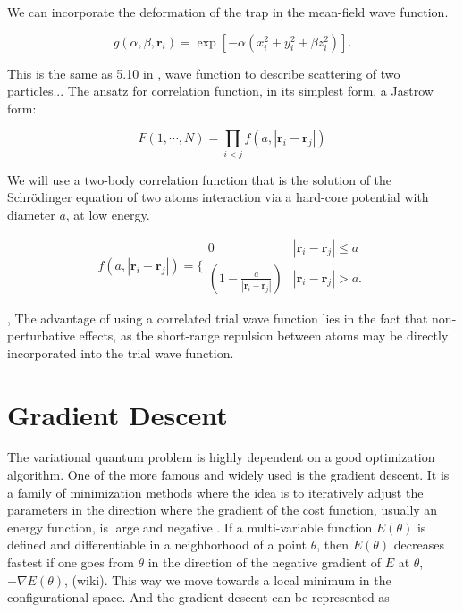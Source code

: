 We can incorporate the deformation of the trap in the mean-field wave function. 

\begin{equation} \label{eq:spf_g}
g(\alpha,\beta,\mathbf{r}_i)= \exp{[-\alpha(x_i^2+y_i^2+\beta z_i^2)]}.
\end{equation}

This is the same as 5.10 in \cite{BECCondInDilute}, wave function to describe scattering of two particles...
The ansatz for correlation function, in its simplest form, a Jastrow form:

\begin{equation}
F(1, \cdots, N) = \prod_{i < j}f(a,|\mathbf{r}_i-\mathbf{r}_j|)
\end{equation}

We will use a two-body correlation function that is the solution of the Schrödinger equation of two atoms interaction via a hard-core potential with diameter $a$, at low energy.

\begin{equation} \label{eq:jastrow_f}
    f(a,|\mathbf{r}_i-\mathbf{r}_j|)=\Bigg\{
 \begin{array}{ll}
	 0 & {|\mathbf{r}_i-\mathbf{r}_j|} \leq {a}\\
	 (1-\frac{a}{|\mathbf{r}_i-\mathbf{r}_j|}) & {|\mathbf{r}_i-\mathbf{r}_j|} > {a}.
 \end{array}
\end{equation}

\cite{nilsen2005vortices}, The advantage of using a correlated trial wave function lies in the fact that non-perturbative effects, as the short-range repulsion between atoms may be directly incorporated into the trial wave function.

\section{Gradient Descent}

The variational quantum problem is highly dependent on a good optimization algorithm. One of the more famous and widely used is the gradient descent. It is a family of minimization methods where the idea is to iteratively adjust the parameters in the direction where the gradient of the cost function, usually an energy function, is large and negative \cite{mehta2019high}. 
If a multi-variable function $E(\theta)$ is defined and differentiable in a neighborhood of a point $\theta$, then $E(\theta)$ decreases fastest if one goes from $\theta$ in the direction of the negative gradient of $E$ at $\theta$, $-\nabla E(\theta)$, (wiki). This way we move towards a local minimum in the configurational space. And the gradient descent can be represented as

